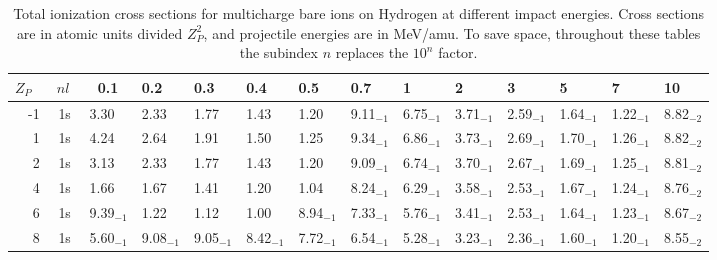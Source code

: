 \documentclass[preprint,showpacs,pra]{revtex4}
\begin{document}
\bigskip 

\begin{table}[tbph]
\caption{Total ionization cross sections for multicharge bare ions on
Hydrogen at different impact energies. Cross sections are in atomic units
divided $Z_{P}^{2}$, and projectile energies are in MeV/amu. To save space,
throughout these tables the subindex $n$ replaces the $10^{n}$ factor.}
\label{table1}%
\begin{tabular}{|r|c|llllllllllll|}
\hline\hline
$Z_P$\  & $\ nl\ \ $ & \ 0.1\  & 0.2 & 0.3 & 0.4 & 0.5 & 0.7 & 1 & 2 & 3 & 5
& 7 & 10 \\ \hline
-1 & 1s & 3.30$_{ }$ & 2.33$_{ }$ & 1.77$_{ }$ & 1.43$_{ }$ & 1.20$_{ }$ & 
9.11$_{-1}$ & 6.75$_{-1}$ & 3.71$_{-1}$ & 2.59$_{-1}$ & 1.64$_{-1}$ & 1.22$%
_{-1}$ & 8.82$_{-2}$ \\ 
1 & 1s & 4.24$_{ }$ & 2.64$_{ }$ & 1.91$_{ }$ & 1.50$_{ }$ & 1.25$_{ }$ & 
9.34$_{-1}$ & 6.86$_{-1}$ & 3.73$_{-1}$ & 2.69$_{-1}$ & 1.70$_{-1}$ & 1.26$%
_{-1}$ & 8.82$_{-2}$ \\ 
2 & 1s & 3.13$_{ }$ & 2.33$_{ }$ & 1.77$_{ }$ & 1.43$_{ }$ & 1.20$_{ }$ & 
9.09$_{-1}$ & 6.74$_{-1}$ & 3.70$_{-1}$ & 2.67$_{-1}$ & 1.69$_{-1}$ & 1.25$%
_{-1}$ & 8.81$_{-2}$ \\ 
4 & 1s & 1.66$_{ }$ & 1.67$_{ }$ & 1.41$_{ }$ & 1.20$_{ }$ & 1.04$_{ }$ & 
8.24$_{-1}$ & 6.29$_{-1}$ & 3.58$_{-1}$ & 2.53$_{-1}$ & 1.67$_{-1}$ & 1.24$%
_{-1}$ & 8.76$_{-2}$ \\ 
6 & 1s & 9.39$_{-1}$ & 1.22$_{ }$ & 1.12$_{ }$ & 1.00$_{ }$ & 8.94$_{-1}$ & 
7.33$_{-1}$ & 5.76$_{-1}$ & 3.41$_{-1}$ & 2.53$_{-1}$ & 1.64$_{-1}$ & 1.23$%
_{-1}$ & 8.67$_{-2}$ \\ 
8 & 1s & 5.60$_{-1}$ & 9.08$_{-1}$ & 9.05$_{-1}$ & 8.42$_{-1}$ & 7.72$_{-1}$
& 6.54$_{-1}$ & 5.28$_{-1}$ & 3.23$_{-1}$ & 2.36$_{-1}$ & 1.60$_{-1}$ & 1.20$%
_{-1}$ & 8.55$_{-2}$ \\ \hline\hline
\end{tabular}%
\end{table}

\newpage
\end{document}
